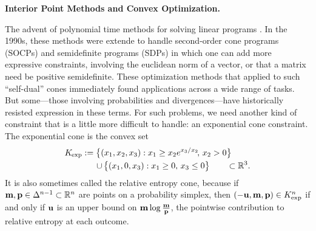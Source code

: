 \documentclass[twoside]{article}
\begin{document}
%
\textbf{Interior Point Methods and Convex Optimization.}


The advent of polynomial time methods for solving linear programs
\parencite{}.
In the 1990s, these methods were extende to handle second-order cone programs (SOCPs) and semidefinite programs (SDPs) in which one can add more expressive constraints,
    involving the euclidean norm of a vector, or that a matrix need be positive semidefinite.
These optimization methods that applied to such ``self-dual'' cones
    immediately found applications across a wide range of tasks.
But some---those involving probabilities and divergences---have historically
resisted expression in these terms. For such problems, we need another kind of constraint
that is a little more difficult to handle: an exponential cone constraint.
%
%
The exponential cone is the convex set
\begin{align*}
        \begin{aligned}
        K_{\mskip-1mu\exp} :=
        \big\{ (x_1, x_2, x_3) &:
                x_1 \ge x_2 e^{x_3 / x_2}\!,\, x_2 > 0 \big\}
            \\[-0.2ex]\quad \mathbin{\cup}\,
        \big\{ (x_1, 0, x_3&) : x_1 \ge 0,\, x_3 \le 0 \big\}
        \qquad \subset \mathbb R^3.
    \end{aligned}
\end{align*}
It is also sometimes called the relative entropy cone, because
if $\mathbf{m}, \mathbf{p} \in \Delta^{n-1} \subset \mathbb R^n$ are points on a probability simplex,
then $(-\mathbf{u}, \mathbf{m}, \mathbf{p}) \in K_{\exp}^n$ if and only if
$\mathbf{u}$ is an upper bound on $\mathbf{m} \log \frac{\mathbf{m}}{\mathbf{p}}$,
the pointwise contribution to relative entropy at each outcome.
%
\end{document}
